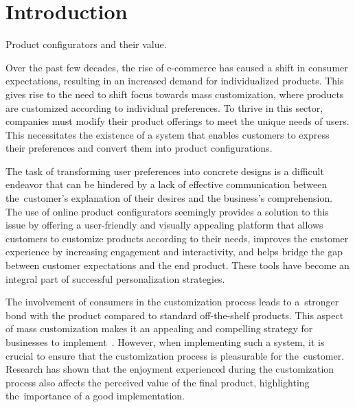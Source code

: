 \chapter*{Introduction}
\setcounter{page}{1}

\begin{chapterabstract}
Product configurators and their value.
\end{chapterabstract}

Over the past few decades, the rise of e-commerce has caused a shift in consumer expectations, resulting in an increased demand for individualized products. This gives rise to the need to shift focus towards mass customization, where products are customized according to individual preferences. To thrive in this sector, companies must modify their product offerings to meet the unique needs of users. This necessitates the existence of a system that enables customers to express their preferences and convert them into product configurations.~\cite{Fulkerson2000}

The task of transforming user preferences into concrete designs is a difficult endeavor that can be hindered by a lack of effective communication between the~customer's explanation of their desires and the business's comprehension. The use of online product configurators seemingly provides a solution to this issue by offering a user-friendly and visually appealing platform that allows customers to customize products according to their needs, improves the customer experience by increasing engagement and interactivity, and helps bridge the gap between customer expectations and the end product. These tools have become an integral part of successful personalization strategies.~\cite{Franke2003}

The involvement of consumers in the customization process leads to a~stron\-ger bond with the product compared to standard off-the-shelf products. This aspect of mass customization makes it an appealing and compelling strategy for businesses to implement~\cite{Schreier2006}. However, when implementing such a system, it is crucial to ensure that the customization process is pleasurable for the~customer. Research has shown that the enjoyment experienced during the customization process also affects the perceived value of the final product, highlighting the~importance of a good implementation.~\cite{Franke2010}

